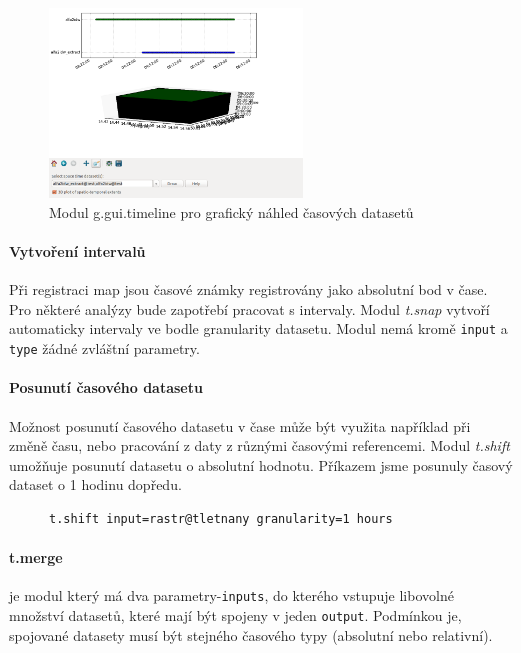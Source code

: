 \documentclass[a4paper,12pt,oneside]{report}
\begin{document}
\begin{figure}[h!]
    \centering
    \includegraphics[width=0.6\textwidth]{./img/temporal/timeline.png}
    \caption[Timeline]{\centering  Modul g.gui.timeline pro grafický náhled časových datasetů}
 \end{figure}  




\paragraph*{Vytvoření intervalů} Při registraci map jsou časové známky registrovány jako absolutní bod v čase. Pro některé analýzy bude zapotřebí pracovat s intervaly. Modul \textit{t.snap} vytvoří automaticky intervaly ve bodle granularity datasetu. Modul nemá kromě \texttt{input} a \texttt{type} žádné zvláštní parametry.



\paragraph*{Posunutí časového datasetu} Možnost posunutí časového datasetu v čase může být využita například při změně času, nebo pracování z daty z různými časovými referencemi. Modul \textit{t.shift} umožňuje posunutí datasetu o absolutní hodnotu. Příkazem jsme posunuly časový dataset o 1 hodinu dopředu. 
\begin{figure}[h!]
\begin{footnotesize}
\lstset{extendedchars=false,
escapeinside=''}
\begin{lstlisting}[style=mybash]
t.shift input=rastr@tletnany granularity=1 hours
\end{lstlisting}
\end{footnotesize} 
\end{figure}



\paragraph*{t.merge} je modul který má dva  parametry-\texttt{inputs}, do kterého vstupuje libovolné množství datasetů, které mají být spojeny v jeden \texttt{output}. Podmínkou je, spojované datasety musí být  stejného  časového typy (absolutní nebo relativní).
\end{document}
